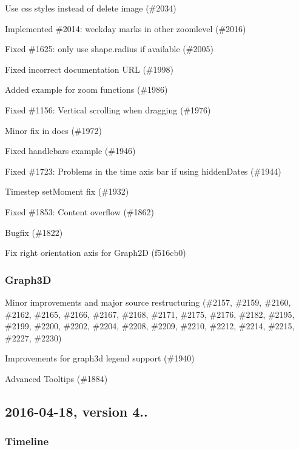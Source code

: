 \begin{DoxyItemize}
\item Use css styles instead of delete image (\#2034)
\item Implemented \#2014\+: weekday marks in other zoomlevel (\#2016)
\item Fixed \#1625\+: only use {\ttfamily shape.\+radius} if available (\#2005)
\item Fixed incorrect documentation U\+RL (\#1998)
\item Added example for zoom functions (\#1986)
\item Fixed \#1156\+: Vertical scrolling when dragging (\#1976)
\item Minor fix in docs (\#1972)
\item Fixed handlebars example (\#1946)
\item Fixed \#1723\+: Problems in the time axis bar if using {\ttfamily hidden\+Dates} (\#1944)
\item Timestep set\+Moment fix (\#1932)
\item Fixed \#1853\+: Content overflow (\#1862)
\item Bugfix (\#1822)
\item Fix right orientation axis for Graph2D (f516cb0)
\end{DoxyItemize}

\subsubsection*{Graph3D}


\begin{DoxyItemize}
\item Minor improvements and major source restructuring (\#2157, \#2159, \#2160, \#2162, \#2165, \#2166, \#2167, \#2168, \#2171, \#2175, \#2176, \#2182, \#2195, \#2199, \#2200, \#2202, \#2204, \#2208, \#2209, \#2210, \#2212, \#2214, \#2215, \#2227, \#2230)
\item Improvements for graph3d legend support (\#1940)
\item Advanced Tooltips (\#1884)
\end{DoxyItemize}

\subsection*{2016-\/04-\/18, version 4..}

\subsubsection*{Timeline}


